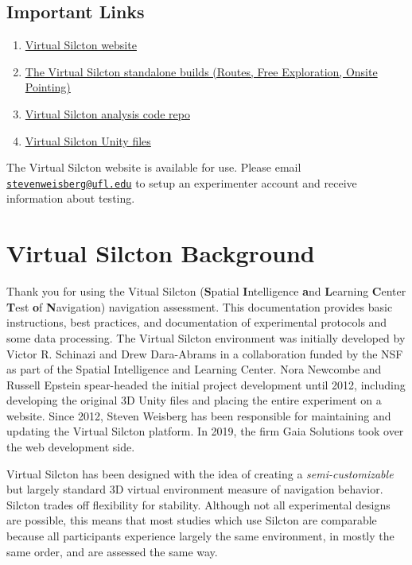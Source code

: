 \documentclass[
  12pt,
]{book}
\providecommand{\tightlist}{%
  \setlength{\itemsep}{0pt}\setlength{\parskip}{0pt}}
\begin{document}
\hypertarget{important-links}{%
\section{Important Links}\label{important-links}}

\begin{enumerate}
\def\labelenumi{\arabic{enumi}.}
\tightlist
\item
  \href{www.virtualsilcton.com}{Virtual Silcton website}
\item
  \href{https://osf.io/fykr7/}{The Virtual Silcton standalone builds (Routes, Free Exploration, Onsite Pointing)}
\item
  \href{https://github.com/smweis/Virtual_Silcton_Analysis}{Virtual Silcton analysis code repo}
\item
  \href{https://github.com/Scann-Lab/VirtualSilctonUnity}{Virtual Silcton Unity files}
\end{enumerate}

The Virtual Silcton website is available for use. Please email \href{mailto:stevenweisberg@ufl.edu}{\nolinkurl{stevenweisberg@ufl.edu}} to setup an experimenter account and receive information about testing.

\hypertarget{virtual-silcton-background}{%
\chapter{Virtual Silcton Background}\label{virtual-silcton-background}}

Thank you for using the Vitual Silcton (\textbf{S}patial \textbf{I}ntelligence \textbf{a}nd \textbf{L}earning \textbf{C}enter \textbf{T}est \textbf{o}f \textbf{N}avigation) navigation assessment. This documentation provides basic instructions, best practices, and documentation of experimental protocols and some data processing. The Virtual Silcton environment was initially developed by Victor R. Schinazi and Drew Dara-Abrams in a collaboration funded by the NSF as part of the Spatial Intelligence and Learning Center. Nora Newcombe and Russell Epstein spear-headed the initial project development until 2012, including developing the original 3D Unity files and placing the entire experiment on a website. Since 2012, Steven Weisberg has been responsible for maintaining and updating the Virtual Silcton platform. In 2019, the firm Gaia Solutions took over the web development side.

Virtual Silcton has been designed with the idea of creating a \emph{semi-customizable} but largely standard 3D virtual environment measure of navigation behavior. Silcton trades off flexibility for stability. Although not all experimental designs are possible, this means that most studies which use Silcton are comparable because all participants experience largely the same environment, in mostly the same order, and are assessed the same way.
\end{document}
